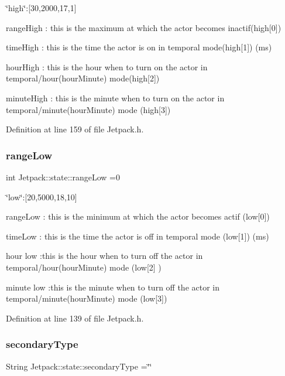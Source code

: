 \char`\"{}high\char`\"{}\+:\mbox{[}30,2000,17,1\mbox{]}

range\+High \+: this is the maximum at which the actor becomes inactif(high\mbox{[}0\mbox{]})

time\+High \+: this is the time the actor is on in temporal mode(high\mbox{[}1\mbox{]}) (ms)

hour\+High \+: this is the hour when to turn on the actor in temporal/hour(hour\+Minute) mode(high\mbox{[}2\mbox{]})

minute\+High \+: this is the minute when to turn on the actor in temporal/minute(hour\+Minute) mode (high\mbox{[}3\mbox{]}) 

Definition at line 159 of file Jetpack.\+h.

\mbox{\label{struct_jetpack_1_1state_ad0343b4fd5740c9c1b0876b27f84ace5}} 
\subsubsection{\texorpdfstring{range\+Low}{rangeLow}}
{\footnotesize\ttfamily int Jetpack\+::state\+::range\+Low =0}

\char`\"{}low\char`\"{}\+:\mbox{[}20,5000,18,10\mbox{]}

range\+Low \+: this is the minimum at which the actor becomes actif (low\mbox{[}0\mbox{]})

time\+Low \+: this is the time the actor is off in temporal mode (low\mbox{[}1\mbox{]}) (ms)

hour low \+:this is the hour when to turn off the actor in temporal/hour(hour\+Minute) mode (low\mbox{[}2\mbox{]} )

minute low \+:this is the minute when to turn off the actor in temporal/minute(hour\+Minute) mode (low\mbox{[}3\mbox{]}) 

Definition at line 139 of file Jetpack.\+h.

\mbox{\label{struct_jetpack_1_1state_a81cf9af139da095b7d91e2a87e50135b}} 
\subsubsection{\texorpdfstring{secondary\+Type}{secondaryType}}
{\footnotesize\ttfamily String Jetpack\+::state\+::secondary\+Type =\char`\"{}\char`\"{}}



